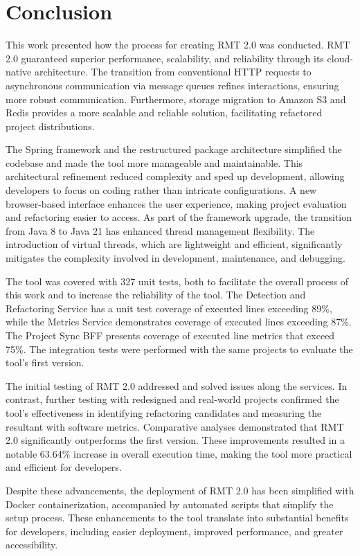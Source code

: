 \chapter{Conclusion}%
\label{conclusion}

This work presented how the process for creating RMT 2.0 was conducted. RMT 2.0 guaranteed superior performance, scalability, and reliability through its cloud-native architecture. The transition from conventional HTTP requests to asynchronous communication via message queues refines interactions, ensuring more robust communication. Furthermore, storage migration to Amazon S3 and Redis provides a more scalable and reliable solution, facilitating refactored project distributions.

The Spring framework and the restructured package architecture simplified the codebase and made the tool more manageable and maintainable. This architectural refinement reduced complexity and sped up development, allowing developers to focus on coding rather than intricate configurations. A new browser-based interface enhances the user experience, making project evaluation and refactoring easier to access. As part of the framework upgrade, the transition from Java 8 to Java 21 has enhanced thread management flexibility. The introduction of virtual threads, which are lightweight and efficient, significantly mitigates the complexity involved in development, maintenance, and debugging.

The tool was covered with 327 unit tests, both to facilitate the overall process of this work and to increase the reliability of the tool. The Detection and Refactoring Service has a unit test coverage of executed lines exceeding 89\%, while the Metrics Service demonstrates coverage of executed lines exceeding 87\%. The Project Sync BFF presents coverage of executed line metrics that exceed 75\%. The integration tests were performed with the same projects to evaluate the tool's first version.

The initial testing of RMT 2.0 addressed and solved issues along the services. In contrast, further testing with redesigned and real-world projects confirmed the tool's effectiveness in identifying refactoring candidates and measuring the resultant with software metrics. Comparative analyses demonstrated that RMT 2.0 significantly outperforms the first version. These improvements resulted in a notable 63.64\% increase in overall execution time, making the tool more practical and efficient for developers.

Despite these advancements, the deployment of RMT 2.0 has been simplified with Docker containerization, accompanied by automated scripts that simplify the setup process. These enhancements to the tool translate into substantial benefits for developers, including easier deployment, improved performance, and greater accessibility.

